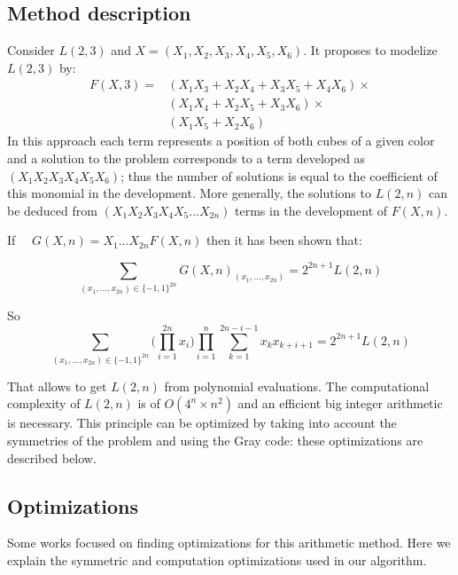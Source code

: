 \subsection{Method description}
Consider $L(2,3)$ and $X=(X_1,X_2,X_3,X_4,X_5,X_6)$. 
It proposes to modelize $L(2,3)$ by: 
\begin{equation}
\begin{aligned}
F(X,3) = & (X_1X_3+X_2X_4+X_3X_5+X_4X_6)\times \\
& (X_1X_4+X_2X_5+X_3X_6)\times\\
& (X_1X_5+X_2X_6)
\end{aligned}
\end{equation}
In this approach each term represents a position of both cubes of a given color and a solution to the problem corresponds to a term developed as $(X_1X_2X_3X_4X_5X_6)$; thus the number of solutions is equal to the coefficient of this monomial in the development. More generally, the solutions to $L(2,n)$ can be deduced from $(X_1X_2X_3X_4X_5...X_{2n})$ terms in the development of $F(X,n)$.

If \ \ $G(X,n) = X_1 ... X_{2n} F(X,n)$ then it has been shown that: 


\begin{equation}
\sum\limits_{(x_1,...,x_{2n}) \in \{-1,1\}^{2n}} G(X,n)_{(x_1,...,x_{2n})} =  2^{2n+1}L(2,n)
\end{equation}

So \hspace*{2cm}
\begin{equation}
\sum\limits_{(x_1,...,x_{2n}) \in \{-1,1\}^{2n}} \big( \prod\limits_{i=1}^{2n} x_i \big) \prod\limits_{i=1}^{n} \sum\limits_{k=1}^{2n-i-1} x_kx_{k+i+1} = 2^{2n+1} L(2,n)
\end{equation}

\noindent That allows to get $L(2,n)$ from polynomial evaluations.
The computational complexity of $L(2,n)$ is of $O(4^n\times n^2)$ and an efficient big integer arithmetic is necessary. This principle can be optimized by taking into account the symmetries of the problem and using the Gray code: these optimizations are described below.

\subsection{Optimizations}
Some works focused on finding optimizations for this arithmetic method\cite{CReSTIC-1154}. Here we explain the symmetric and computation optimizations used in our algorithm.

